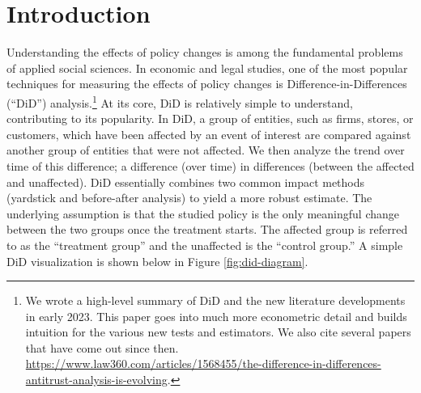 \documentclass[12pt]{article}
\begin{document}
\tableofcontents

\doublespacing

\newpage
\section{Introduction} \label{sec:introduction}
Understanding the effects of policy changes is among the fundamental problems of applied social sciences. In economic and legal studies, one of the most popular techniques for measuring the effects of policy changes is Difference-in-Differences (“DiD”) analysis.\footnote{We wrote a high-level summary of DiD and the new literature developments in early 2023. This paper goes into much more econometric detail and builds intuition for the various new tests and estimators. We also cite several papers that have come out since then. \url{https://www.law360.com/articles/1568455/the-difference-in-differences-antitrust-analysis-is-evolving}.}  At its core, DiD is relatively simple to understand, contributing to its popularity. In DiD, a group of entities, such as firms, stores, or customers, which have been affected by an event of interest are compared against another group of entities that were not affected. We then analyze the trend over time of this difference; a difference (over time) in differences (between the affected and unaffected). DiD essentially combines two common impact methods (yardstick and before-after analysis) to yield a more robust estimate. The underlying assumption is that the studied policy is the only meaningful change between the two groups once the treatment starts. The affected group is referred to as the “treatment group” and the unaffected is the “control group.” A simple DiD visualization is shown below in Figure \ref{fig:did-diagram}.
\end{document}
